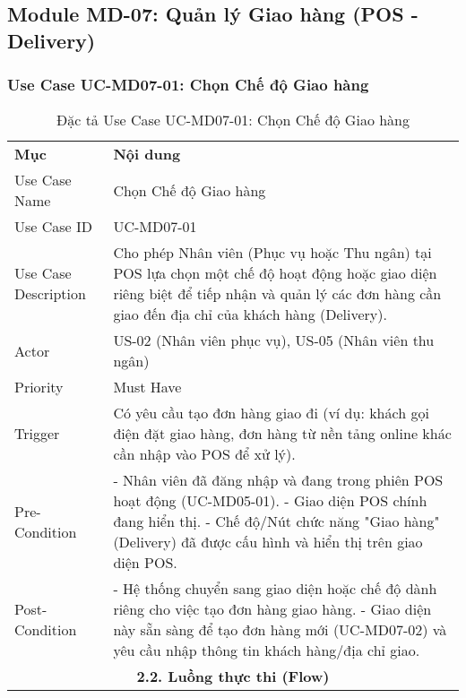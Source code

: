 \subsection{Module MD-07: Quản lý Giao hàng (POS - Delivery)}

\subsubsection{Use Case UC-MD07-01: Chọn Chế độ Giao hàng}

\begin{longtable}{|m{4cm}|p{11cm}|}
\caption{Đặc tả Use Case UC-MD07-01: Chọn Chế độ Giao hàng} \label{tab:uc_md07_01} \\
\hline

\endhead %
\hline
\endfoot %
\hline
\endlastfoot %
\multicolumn{2}{|c|}{\textbf{2.1. Tóm tắt (Summary)}} \\
\hline
\textbf{Mục} & \textbf{Nội dung} \\
\hline
Use Case Name & Chọn Chế độ Giao hàng \\
\hline
Use Case ID & UC-MD07-01 \\
\hline
Use Case Description & Cho phép Nhân viên (Phục vụ hoặc Thu ngân) tại POS lựa chọn một chế độ hoạt động hoặc giao diện riêng biệt để tiếp nhận và quản lý các đơn hàng cần giao đến địa chỉ của khách hàng (Delivery). \\
\hline
Actor & US-02 (Nhân viên phục vụ), US-05 (Nhân viên thu ngân) \\
\hline
Priority & Must Have \\
\hline
Trigger & Có yêu cầu tạo đơn hàng giao đi (ví dụ: khách gọi điện đặt giao hàng, đơn hàng từ nền tảng online khác cần nhập vào POS để xử lý). \\
\hline
Pre-Condition & - Nhân viên đã đăng nhập và đang trong phiên POS hoạt động (UC-MD05-01). \newline - Giao diện POS chính đang hiển thị. \newline - Chế độ/Nút chức năng "Giao hàng" (Delivery) đã được cấu hình và hiển thị trên giao diện POS. \\
\hline
Post-Condition & - Hệ thống chuyển sang giao diện hoặc chế độ dành riêng cho việc tạo đơn hàng giao hàng. \newline - Giao diện này sẵn sàng để tạo đơn hàng mới (UC-MD07-02) và yêu cầu nhập thông tin khách hàng/địa chỉ giao. \\
\hline
\multicolumn{2}{|c|}{\textbf{2.2. Luồng thực thi (Flow)}} \\

\end{longtable}
